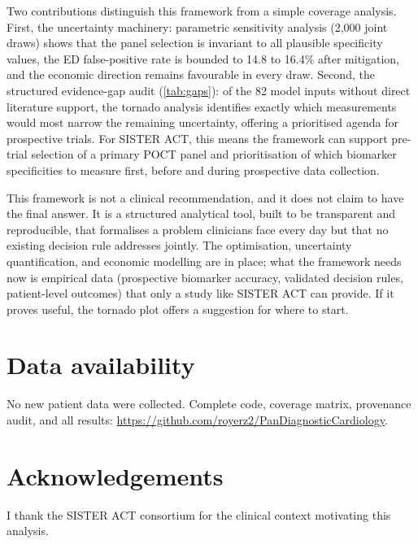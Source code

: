 \documentclass[11pt, oneside]{article}
\newenvironment{acknowledgements}{\section*{Acknowledgements}}{}
\begin{document}
Two contributions distinguish this framework from a simple coverage analysis. First, the uncertainty machinery: parametric sensitivity analysis (2{,}000 joint draws) shows that the panel selection is invariant to all plausible specificity values, the ED false-positive rate is bounded to 14.8 to 16.4\% after mitigation, and the economic direction remains favourable in every draw. Second, the structured evidence-gap audit (\cref{tab:gaps}): of the 82 model inputs without direct literature support, the tornado analysis identifies exactly which measurements would most narrow the remaining uncertainty, offering a prioritised agenda for prospective trials. For SISTER ACT, this means the framework can support pre-trial selection of a primary POCT panel and prioritisation of which biomarker specificities to measure first, before and during prospective data collection.

This framework is not a clinical recommendation, and it does not claim to have the final answer. It is a structured analytical tool, built to be transparent and reproducible, that formalises a problem clinicians face every day but that no existing decision rule addresses jointly. The optimisation, uncertainty quantification, and economic modelling are in place; what the framework needs now is empirical data (prospective biomarker accuracy, validated decision rules, patient-level outcomes) that only a study like SISTER ACT can provide. If it proves useful, the tornado plot offers a suggestion for where to start.


\section*{Data availability}

No new patient data were collected. Complete code, coverage matrix, provenance audit, and all results: \url{https://github.com/royerz2/PanDiagnosticCardiology}.

\begin{acknowledgements}
I thank the SISTER ACT consortium for the clinical context motivating this analysis.
\end{acknowledgements}



\end{document}
